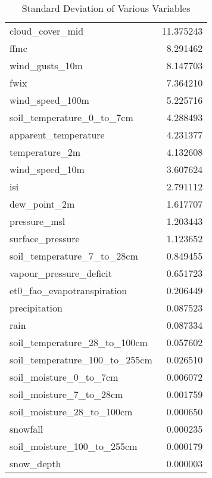 \begin{table}[htbp]
\begin{tabular}{l r}
		cloud\_cover\_mid                    & 11.375243 \\
		ffmc                                 & 8.291462 \\
		wind\_gusts\_10m                     & 8.147703 \\
		fwix                                 & 7.364210 \\
		wind\_speed\_100m                    & 5.225716 \\
		soil\_temperature\_0\_to\_7cm        & 4.288493 \\
		apparent\_temperature                & 4.231377 \\
		temperature\_2m                      & 4.132608 \\
		wind\_speed\_10m                     & 3.607624 \\
		isi                                  & 2.791112 \\
		dew\_point\_2m                       & 1.617707 \\
		pressure\_msl                        & 1.203443 \\
		surface\_pressure                    & 1.123652 \\
		soil\_temperature\_7\_to\_28cm       & 0.849455 \\
		vapour\_pressure\_deficit            & 0.651723 \\
		et0\_fao\_evapotranspiration         & 0.206449 \\
		precipitation                        & 0.087523 \\
		rain                                 & 0.087334 \\
		soil\_temperature\_28\_to\_100cm     & 0.057602 \\
		soil\_temperature\_100\_to\_255cm    & 0.026510 \\
		soil\_moisture\_0\_to\_7cm           & 0.006072 \\
		soil\_moisture\_7\_to\_28cm          & 0.001759 \\
		soil\_moisture\_28\_to\_100cm        & 0.000650 \\
		snowfall                             & 0.000235 \\
		soil\_moisture\_100\_to\_255cm       & 0.000179 \\
		snow\_depth                          & 0.000003 \\
		\hline
	\end{tabular}
	\caption{Standard Deviation of Various Variables}
	\label{tab:std_deviations}
\end{table}



